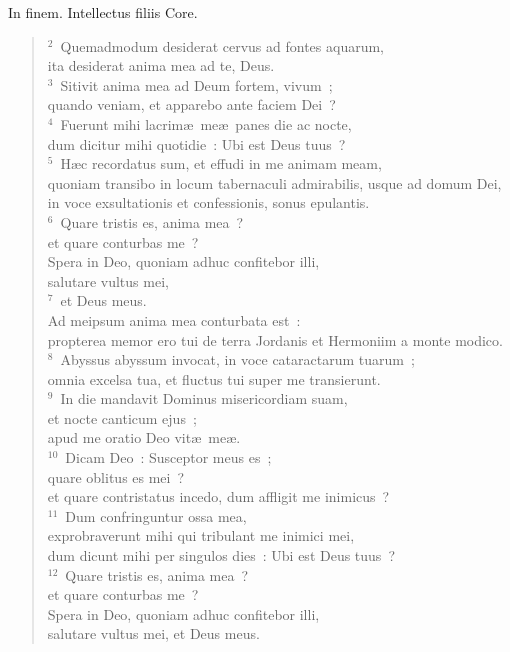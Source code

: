 \bchapter
\lettrine[lines=3,image=true,loversize=0.05,lraise=-0.03]{I}{}n finem. Intellectus filiis Core.
\begin{flushleft}\begin{verse}\vspace{6pt}${}^{2}$~Quemadmodum desiderat cervus ad fontes aquarum,\\ ita desiderat anima mea ad te, Deus.\\
${}^{3}$~Sitivit anima mea ad Deum fortem, vivum~;\\ quando veniam, et apparebo ante faciem Dei~?\\
${}^{4}$~Fuerunt mihi lacrim\ae\ me\ae\ panes die ac nocte,\\ dum dicitur mihi quotidie~: Ubi est Deus tuus~?\\
${}^{5}$~H\ae c recordatus sum, et effudi in me animam meam,\\ quoniam transibo in locum tabernaculi admirabilis, usque ad domum Dei,\\ in voce exsultationis et confessionis, sonus epulantis.\\
${}^{6}$~Quare tristis es, anima mea~?\\ et quare conturbas me~?\\ Spera in Deo, quoniam adhuc confitebor illi,\\ salutare vultus mei,\\
${}^{7}$~et Deus meus.\\ Ad meipsum anima mea conturbata est~:\\ propterea memor ero tui de terra Jordanis et Hermoniim a monte modico.\\
${}^{8}$~Abyssus abyssum invocat, in voce cataractarum tuarum~;\\ omnia excelsa tua, et fluctus tui super me transierunt.\\
${}^{9}$~In die mandavit Dominus misericordiam suam,\\ et nocte canticum ejus~;\\ apud me oratio Deo vit\ae\ me\ae .\\
${}^{10}$~Dicam Deo~: Susceptor meus es~;\\ quare oblitus es mei~?\\ et quare contristatus incedo, dum affligit me inimicus~?\\
${}^{11}$~Dum confringuntur ossa mea,\\ exprobraverunt mihi qui tribulant me inimici mei,\\ dum dicunt mihi per singulos dies~: Ubi est Deus tuus~?\\
${}^{12}$~Quare tristis es, anima mea~?\\ et quare conturbas me~?\\ Spera in Deo, quoniam adhuc confitebor illi,\\ salutare vultus mei, et Deus meus.\end{verse}\end{flushleft}



